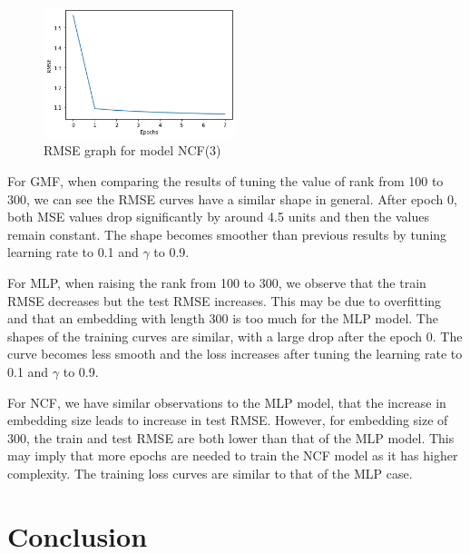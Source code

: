 \documentclass[final]{cvpr}
\begin{document}
\begin{figure}
	\includegraphics[width=0.5\textwidth]{ncf_3.png}
	\caption{RMSE graph for model NCF(3)}
\end{figure}

\hspace{10em}

For GMF, when comparing the results of tuning the value of rank from 100 to 300, we can see the RMSE curves have a similar shape in general. After epoch 0, both MSE values drop significantly by around 4.5 units and then the values remain constant. The shape becomes smoother than previous results by tuning learning rate to 0.1 and $\gamma$ to 0.9. 

For MLP, when raising the rank from 100 to 300, we observe that the train RMSE decreases but the test RMSE increases. This may be due to overfitting and that an embedding with length 300 is too much for the MLP model. The shapes of the training curves are similar, with a large drop after the epoch 0. The curve becomes less smooth and the loss increases after tuning the learning rate to 0.1 and $\gamma$ to 0.9.

For NCF, we have similar observations to the MLP model, that the increase in embedding size leads to increase in test RMSE. However, for embedding size of 300, the train and test RMSE are both lower than that of the MLP model. This may imply that more epochs are needed to train the NCF model as it has higher complexity. The training loss curves are similar to that of the MLP case. 

\section{Conclusion}

{\small
	
	
}
\end{document}
